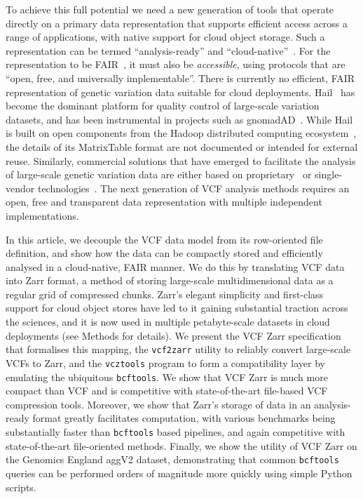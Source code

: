 \documentclass[a4paper,num-refs]{oup-contemporary}
\begin{document}
To achieve this full potential we
need a new generation of tools that operate directly
on a primary data representation that supports
efficient access across a range of applications,
with native support for cloud object storage.
Such a representation can be termed ``analysis-ready''
and ``cloud-native''~\citep{abernathey2021cloud}.
For the representation to be FAIR~\citep{wilkinson2016fair},
it must also be \emph{accessible}, using protocols that are
``open, free, and universally implementable''.
There is currently no efficient, FAIR representation of genetic variation
data suitable for cloud deployments.
Hail~\cite{ganna2016ultra,hail2024} has become the dominant platform
for quality control of large-scale variation datasets,
and has been instrumental in projects such as
gnomadAD~\cite{karczewski2020mutational,chen2024genomic}.
While Hail is built on open components
from the Hadoop distributed computing ecosystem~\citep{white2012hadoop},
the details of its MatrixTable format are not documented
or intended for external reuse.
Similarly, commercial solutions that have emerged to facilitate
the analysis of large-scale genetic variation data are either
based on proprietary~\cite{basespace2024,graf2024,googlelifesciences2024,
awshealthomics2024,microsoftgenomics2024}
or single-vendor technologies~\cite[e.g.][]{tiledb2024,genomicsdb2024}.
The next generation of VCF analysis methods requires
an open, free and transparent data representation
with multiple independent implementations.

In this article, we decouple the VCF data model from its row-oriented
file definition, and show how the data can be
compactly stored and efficiently analysed in a cloud-native, FAIR manner.
We do this by translating VCF data into Zarr format,
a method of storing large-scale multidimensional data as a regular
grid of compressed chunks.
Zarr's elegant simplicity and first-class support for
cloud object stores have led to
it gaining substantial traction
across the sciences, and it is now used in multiple petabyte-scale
datasets in cloud deployments (see Methods for details).
We present the VCF Zarr specification that formalises this
mapping, the \texttt{vcf2zarr}
utility to reliably convert large-scale VCFs to Zarr,
and the \texttt{vcztools} program to form a compatibility layer by
emulating the ubiquitous \texttt{bcftools}.
We show that VCF Zarr is much more compact than
VCF and is competitive with state-of-the-art
file-based VCF compression tools.
Moreover, we show that Zarr's storage of data in an analysis-ready
format greatly facilitates computation,
with various benchmarks being substantially faster than
\texttt{bcftools} based pipelines, and again competitive
with state-of-the-art file-oriented methods. Finally, we show the
utility of VCF Zarr on the Genomics England aggV2 dataset,
demonstrating that common \texttt{bcftools} queries can be performed orders
of magnitude more quickly using simple Python scripts.
\end{document}
